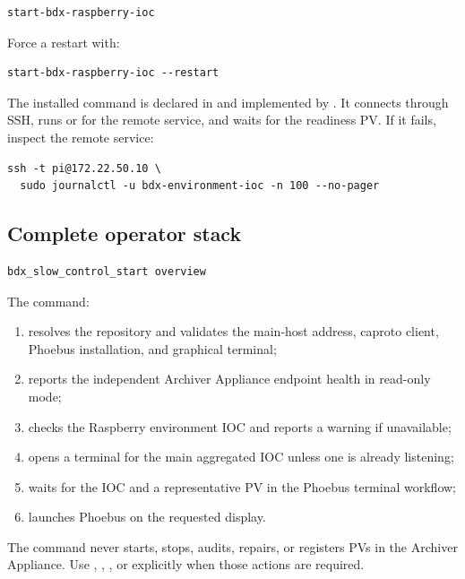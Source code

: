 \begin{lstlisting}[style=shell]
start-bdx-raspberry-ioc
\end{lstlisting}

Force a restart with:

\begin{lstlisting}[style=shell]
start-bdx-raspberry-ioc --restart
\end{lstlisting}

The installed command is declared in  and implemented by . It connects through SSH, runs  or  for the remote  service, and waits for the readiness PV. If it fails, inspect the remote service:

\begin{lstlisting}[style=shell]
ssh -t pi@172.22.50.10 \
  sudo journalctl -u bdx-environment-ioc -n 100 --no-pager
\end{lstlisting}

\subsection{Complete operator stack}

\begin{lstlisting}[style=shell]
bdx_slow_control_start overview
\end{lstlisting}

The command:

\begin{enumerate}
  \item resolves the repository and validates the main-host address, caproto client, Phoebus installation, and graphical terminal;
  \item reports the independent Archiver Appliance endpoint health in read-only mode;
  \item checks the Raspberry environment IOC and reports a warning if unavailable;
  \item opens a terminal for the main aggregated IOC unless one is already listening;
  \item waits for the IOC and a representative PV in the Phoebus terminal workflow;
  \item launches Phoebus on the requested display.
\end{enumerate}

The command never starts, stops, audits, repairs, or registers PVs in the Archiver Appliance. Use , , , or  explicitly when those actions are required.

